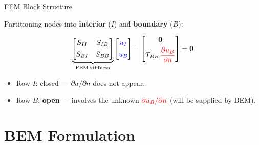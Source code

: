 \documentclass[aspectratio=169]{beamer}
\begin{document}
\begin{frame}{FEM Block Structure}

  Partitioning nodes into \textbf{interior} ($I$) and \textbf{boundary} ($B$):

  \[
    \underbrace{
    \begin{bmatrix}
      S_{II} & S_{IB} \\[4pt]
      S_{BI} & S_{BB}
    \end{bmatrix}
    }_{\text{FEM stiffness}}
    \begin{bmatrix} \textcolor{blue}{u_I} \\[4pt] \textcolor{blue}{u_B} \end{bmatrix}
    -
    \begin{bmatrix} \mathbf{0} \\[4pt] T_{BB}\,\textcolor{red}{\dfrac{\partial u_B}{\partial n}} \end{bmatrix}
    = \mathbf{0}
  \]

  \bigskip
  \begin{itemize}
    \item Row $I$: closed — $\partial u/\partial n$ does not appear.
    \item Row $B$: \textbf{open} — involves the unknown
          $\textcolor{red}{\partial u_B/\partial n}$ (will be supplied by BEM).
  \end{itemize}

\end{frame}

\section{BEM Formulation}
\end{document}
